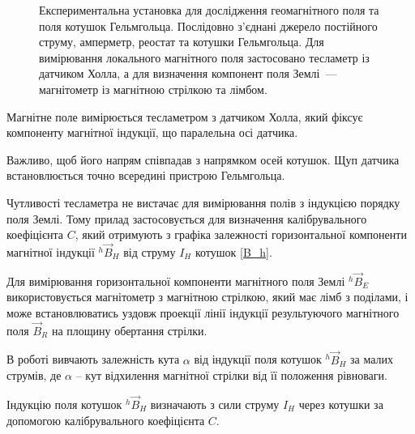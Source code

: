 \begin{figure}[h!]
{
    }
 \caption{Експериментальна установка для дослідження геомагнітного поля та поля котушок Гельмгольца.
    Послідовно з'єднані джерело постійного струму, амперметр, реостат та котушки Гельмгольца. Для вимірювання локального магнітного поля застосовано тесламетр із датчиком Холла, а для визначення компонент поля Землі~--- магнітометр із магнітною стрілкою та лімбом. \label{Exp.equip}}
\end{figure}



Магнітне поле вимірюється тесламетром з датчиком Холла, який фіксує компоненту магнітної індукції, що паралельна осі датчика.

Важливо, щоб його напрям співпадав з напрямком осей котушок.
Щуп датчика встановлюється точно всередині пристрою Гельмгольца.

Чутливості тесламетра не вистачає для вимірювання полів з індукцією порядку поля Землі.
Тому прилад застосовується для визначення калібрувального коефіцієнта $C$, який отримують з графіка залежності горизонтальної компоненти магнітної індукції $ {}^{h}\vec{B}_{H}$ від струму $I_{H}$ котушок \eqref{B_h}.


Для вимірювання горизонтальної компоненти магнітного поля Землі  $ {}^{h}\vec{B}_{E}$
використовується магнітометр з магнітною стрілкою, який має лімб з поділами, і може
встановлюватись уздовж проекції лінії індукції результуючого магнітного поля $\vec{B}_{R}$ на площину обертання
стрілки.

В роботі вивчають залежність кута $\alpha$ від індукції поля котушок $ {}^{h}\vec{B}_{H}$
за малих струмів, де $\alpha$  -- кут відхилення магнітної стрілки від її положення рівноваги.

Індукцію поля котушок  $ {}^{h}\vec{B}_{H} $ визначають з сили струму $I_{H}$ через котушки за допомогою калібрувального коефіцієнта $C$.



